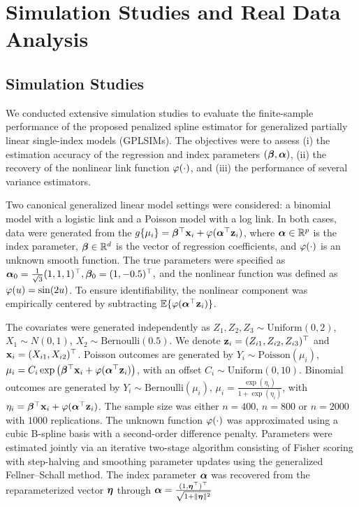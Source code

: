 \newpage

\section{Simulation Studies and Real Data Analysis}

\subsection{Simulation Studies}

We conducted extensive simulation studies to evaluate the finite-sample performance of the proposed penalized spline estimator for generalized partially linear single-index models (GPLSIMs). The objectives were to assess (i) the estimation accuracy of the regression and index parameters $(\bm\beta, \bm\alpha)$, (ii) the recovery of the nonlinear link function $\varphi(\cdot)$, and (iii) the performance of several variance estimators. 

Two canonical generalized linear model settings were considered: a binomial model with a logistic link and a Poisson model with a log link. In both cases, data were generated from the $g\{\mu_i\} = \bm\beta^\top \mathbf{x}_i + \varphi(\bm\alpha^\top \mathbf{z}_i)$, where $\bm\alpha \in \mathbb{R}^p$ is the index parameter, $\bm\beta \in \mathbb{R}^d$ is the vector of regression coefficients, and $\varphi(\cdot)$ is an unknown smooth function. The true parameters were specified as
$\bm\alpha_0 = \frac{1}{\sqrt{3}}(1,1,1)^\top, 
\bm\beta_0 = (1, -0.5)^\top,$
and the nonlinear function was defined as $\varphi(u) = \sin(2u)$. To ensure identifiability, the nonlinear component was empirically centered by subtracting $\mathbb{E}\{\varphi(\bm\alpha^\top \mathbf{z}_i)\}$.

The covariates were generated independently as $Z_1, Z_2, Z_3 \sim \text{Uniform}(0,2)$,   $X_1 \sim N(0,1)$, $X_2 \sim \text{Bernoulli}(0.5)$. We denote $  \mathbf{z}_i = (Z_{i1}, Z_{i2},Z_{i3})^\top$ and $\mathbf{x}_i = (X_{i1}, X_{i2})^\top$. Poisson outcomes are generated by $Y_i \sim \text{Poisson}(\mu_i)$, $\mu_i =  C_i\exp\left(\bm\beta^\top \mathbf{x}_i + \varphi(\bm\alpha^\top \mathbf{z}_i) \right)$, with an offset $C_i \sim \text{Uniform}(0,10)$. Binomial outcomes are generated by $Y_i \sim \text{Bernoulli}(\mu_i)$, $\mu_i = \frac{\exp(\eta_i)}{1 + \exp(\eta_i)}$, with $\eta_i = \bm\beta^\top \mathbf{x}_i + \varphi(\bm\alpha^\top \mathbf{z}_i)$. The sample size was either $n=400$, $n=800$ or $n=2000$ with $1000$ replications. The unknown function $\varphi(\cdot)$ was approximated using a cubic B-spline basis with a second-order difference penalty. Parameters were estimated jointly via an iterative two-stage algorithm consisting of Fisher scoring with step-halving and smoothing parameter updates using the generalized Fellner–Schall method. The index parameter $\bm\alpha$ was recovered from the reparameterized vector $\bm\eta$ through $\bm\alpha = \frac{(1, \bm\eta^\top)^\top}{\sqrt{1 + \|\bm\eta\|^2}}$

